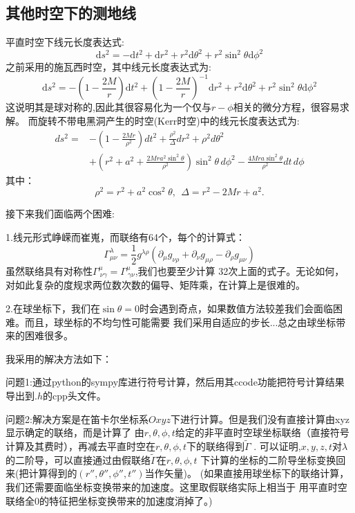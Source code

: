 \documentclass[a4paper, 12pt]{article}
\begin{document}
    \subsection{其他时空下的测地线}
    平直时空下线元长度表达式:
    \[\mathrm ds^2 = -\mathrm dt^2 +\mathrm dr^2 + r^2\mathrm d\theta^2 + r^2\sin^2 \theta \mathrm d\phi ^2\]
    之前采用的施瓦西时空，其中线元长度表达式为:
    \[\mathrm ds^2 = -(1-\frac{2M}{r} )\mathrm dt^2 +(1-\frac{2M}{r} )^{-1}\mathrm dr^2 + r^2\mathrm d\theta^2 + r^2\sin^2 \theta \mathrm d\phi ^2\]
    这说明其是球对称的,因此其很容易化为一个仅与$r-\phi$相关的微分方程，很容易求解。
    而旋转不带电黑洞产生的时空(Kerr时空)中的线元长度表达式为:
    \begin{align*}
    ds^2 =& -\left(1 - \frac{2Mr}{\rho^2}\right) dt^2 + \frac{\rho^2}{\Delta} dr^2 + \rho^2 d\theta^2\\
        & + \left(r^2 + a^2 + \frac{2Mr a^2 \sin^2 \theta}{\rho^2}\right) \sin^2 \theta \, d\phi^2 - \frac{4Mr a \sin^2 \theta}{\rho^2} dt \, d\phi
    \end{align*}
    其中：
    \[\rho^2 = r^2 + a^2 \cos^2 \theta, \ \ \Delta = r^2 - 2Mr + a^2. \]
    \par 接下来我们面临两个困难:
    \par 1.线元形式峥嵘而崔嵬，而联络有64个，每个的计算式：
    \[
    \Gamma^\lambda_{\mu\nu} = \frac{1}{2} g^{\lambda\rho} \left( \partial_\mu g_{\nu\rho} + \partial_\nu g_{\mu\rho} - \partial_\rho g_{\mu\nu} \right)
    \]
    虽然联络具有对称性$\Gamma^{\mu}_{\ \nu \gamma} = \Gamma^{\mu}_{\  \gamma\nu}$,我们也要至少计算
    32次上面的式子。无论如何，对如此复杂的度规求两位数次数的偏导、矩阵乘，在计算上是很难的。
    \par
    2.在球坐标下，我们在$\sin \theta = 0$时会遇到奇点，如果数值方法较差我们会面临困难。而且，球坐标的不均匀性可能需要
    我们采用自适应的步长...总之由球坐标带来的困难很多。
    \par
    我采用的解决方法如下：\par
    问题1:通过python的sympy库进行符号计算，然后用其ccode功能把符号计算结果导出到$.h$的cpp头文件。\par
    问题2:解决方案是在笛卡尔坐标系$Oxyz$下进行计算。但是我们没有直接计算由xyz显示确定的联络，而是计算了
    由$r,\theta,\phi,t$给定的非平直时空球坐标联络（直接符号计算及其费时），再减去平直时空在$r,\theta,\phi,t$下的联络得到$\widetilde{\Gamma}$ .
    可以证明,$x,y,z,t$对$\lambda$的二阶导，可以直接通过由假联络$\widetilde{\Gamma}$在$r,\theta,\phi,t$
    下计算的坐标的二阶导坐标变换回来(把计算得到的$(r'',\theta'',\phi'',t'')$当作矢量)。
    (如果直接用球坐标下的联络计算，我们还需要面临坐标变换带来的加速度。这里取假联络实际上相当于
    用平直时空联络全0的特征把坐标变换带来的加速度消掉了。)
\end{document}
